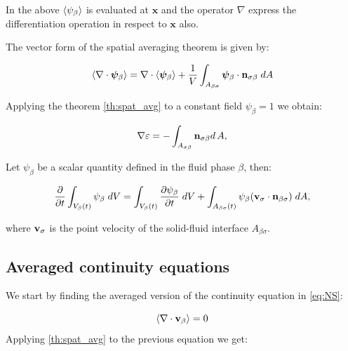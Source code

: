 In the above ${\left< \psi_{\beta} \right>}$ is evaluated at $\mathbf{x}$ and the operator $\nabla$ express the differentiation operation in respect to $\mathbf{x}$ also.

\begin{corollary}
	The vector form of the spatial averaging theorem is given by:
	
	\begin{equation}
	{\left< \nabla \cdot \boldsymbol{\psi}_{\beta} \right>} = \nabla \cdot {\left<  \boldsymbol{\psi}_{\beta} \right>} + \dfrac{1}{V} \int_{A_{\beta \sigma}}  \boldsymbol{\psi}_{\beta} \cdot \mathbf{n}_{\sigma \beta} \;dA
			\label{th:vec_spat_avg}
	\end{equation}
\end{corollary}

\begin{corollary}
	Applying the theorem \ref{th:spat_avg} to a constant field $\psi_{\beta} = 1$ we obtain:
	
	\begin{equation}
		\nabla \varepsilon = - \int_{A_{\sigma \beta}} \mathbf{n}_{\sigma \beta} d \, A,
	\end{equation}
\end{corollary}


\begin{theorem}
	Let $\psi_{\beta}$ be a scalar quantity defined in the fluid phase $\beta$, then:
	
	\begin{equation}
	\dfrac{\partial}{\partial t} \int_{V_\beta(t)} \psi_{\beta} \; dV =  \int_{V_\beta(t)} \dfrac{\partial \psi_{\beta}}{\partial t} \; dV + \int_{A_{\beta \sigma}(t)} \psi_{\beta} (\textbf{v}_{\sigma} \cdot \mathbf{n}_{\beta \sigma} ) \;dA,
	\label{th:transport}
	\end{equation}
	
	where $\textbf{v}_{\sigma}$ is the point velocity of the solid-fluid interface $A_{\beta \sigma}$.
\end{theorem}


\subsection{Averaged continuity equations}


We start by finding the averaged version of the continuity equation in \eqref{eq:NS}:

\begin{equation}
{\left< \nabla \cdot \textbf{v}_{\beta}\right>}   = 0
\label{eq:superf_avg_cont}
\end{equation}
Applying \ref{th:spat_avg} to the previous equation we get:


